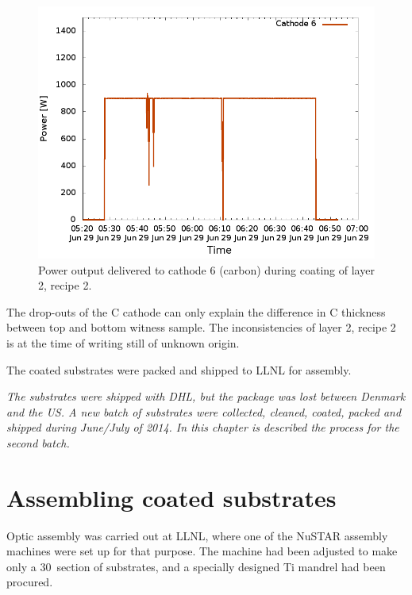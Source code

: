 \begin{figure}[!h]
  \centering  \includegraphics[width=0.7\linewidth]{figures/cast/power_cat6.png}
  \caption{\footnotesize Power output delivered to cathode 6 (carbon) during coating of layer 2, recipe 2. }
  \label{fig:cast_coatings_power_recipe2_layer2}
\end{figure}

The drop-outs of the C cathode can only explain the difference in C thickness between top and bottom witness sample. The inconsistencies of layer 2, recipe 2 is at the time of writing still of unknown origin.

The coated substrates were packed and shipped to LLNL for assembly.

\emph{The substrates were shipped with DHL, but the package was lost between Denmark and the US. A new batch of substrates were collected, cleaned, coated, packed and shipped during June/July of 2014. In this chapter is described the process for the second batch.}

\section{Assembling coated substrates}
Optic assembly was carried out at LLNL, where one of the NuSTAR assembly machines were set up for that purpose. The machine had been adjusted to make only a 30\degr\ section of substrates, and a specially designed Ti mandrel had been procured.

